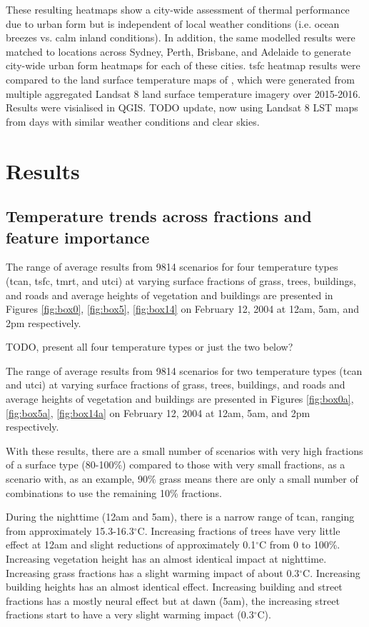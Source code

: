 \documentclass[final,3p,times,authoryear]{elsarticle}
\begin{document}
These resulting heatmaps show a city-wide assessment of thermal performance due to urban form but is independent of local weather conditions (i.e. ocean breezes vs. calm inland conditions). In addition, the same modelled results were matched to locations across Sydney, Perth, Brisbane, and Adelaide to generate city-wide urban form heatmaps for each of these cities.  \gls{tsfc} heatmap results were compared to the land surface temperature maps of \cite{Devereux2017}, which were generated from multiple aggregated Landsat 8 land surface temperature imagery over 2015-2016. Results were visialised in QGIS. TODO update, now using Landsat 8 LST maps from days with similar weather conditions and clear skies.

\section{Results}\label{sec:results}

\subsection{Temperature trends across fractions and feature importance}\label{sec:resulttrends}

The range of average results from 9814 scenarios for four temperature types (\gls{tcan}, \gls{tsfc}, \gls{tmrt}, and \gls{utci}) at varying surface fractions of grass, trees, buildings, and roads and average heights of vegetation and buildings are presented in Figures \ref{fig:box0}, \ref{fig:box5}, \ref{fig:box14} on February 12, 2004 at 12am, 5am, and 2pm respectively.


TODO, present all four temperature types or just the two below?

The range of average results from 9814 scenarios for two temperature types (\gls{tcan} and \gls{utci}) at varying surface fractions of grass, trees, buildings, and roads and average heights of vegetation and buildings are presented in Figures \ref{fig:box0a}, \ref{fig:box5a}, \ref{fig:box14a} on February 12, 2004 at 12am, 5am, and 2pm respectively.

With these results, there are a small number of scenarios with very high fractions of a surface type (80-100\%) compared to those with very small fractions, as a scenario with, as an example, 90\% grass means there are only a small number of combinations to use the remaining 10\% fractions.

During the nighttime (12am and 5am), there is a narrow range of \gls{tcan}, ranging from approximately 15.3-16.3$^{\circ}$C. Increasing fractions of trees have very little effect at 12am and slight reductions of approximately 0.1$^{\circ}$C from 0 to 100\%. Increasing vegetation height has an almost identical impact at nighttime. Increasing grass fractions has a slight warming impact of about 0.3$^{\circ}$C. Increasing building heights has an almost identical effect. Increasing building and street fractions has a mostly neural effect but at dawn (5am), the increasing street fractions start to have a very slight warming impact (0.3$^{\circ}$C). 
\end{document}
